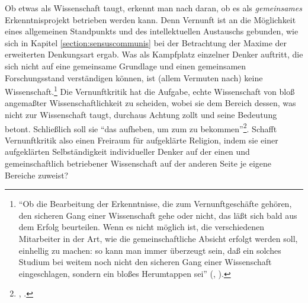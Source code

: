 Ob etwas als Wissenschaft taugt, erkennt man nach  daran,
ob es als \emph{gemeinsames} Erkenntnisprojekt betrieben werden kann. Denn Vernunft
ist an die Möglichkeit eines allgemeinen Standpunkts und des
intellektuellen Austauschs gebunden, wie sich in Kapitel
\ref{section:sensuscommunis} bei der Betrachtung der Maxime der erweiterten
Denkungsart ergab. Was als Kampfplatz einzelner Denker auftritt, die sich nicht
auf eine gemeinsame Grundlage und einen gemeinsamen Forschungsstand verständigen
können, ist (allem Vermuten nach) keine Wissenschaft.\footnote{\enquote{Ob die
Bearbeitung der Erkenntnisse, die zum Vernunftgeschäfte gehören, den sicheren
Gang einer Wissenschaft gehe oder nicht, das läßt sich bald aus dem Erfolg beurteilen.
Wenn \punkt{} es nicht möglich ist, die verschiedenen Mitarbeiter in der Art,
wie die gemeinschaftliche Absicht erfolgt werden soll, einhellig zu machen: so
kann man immer überzeugt sein, daß ein solches Studium bei weitem noch nicht den
sicheren Gang einer Wissenschaft eingeschlagen, sondern ein bloßes Herumtappen
sei} (\cite[][B vii]{Kant:KritikderreinenVernunft2003},
\cite[][III: 7.2--4, 7--11]{Kant:GesammelteWerke1900ff.}).} Die Vernunftkritik hat
die Aufgabe, echte Wissenschaft von bloß angemaßter Wissenschaftlichkeit
zu scheiden, wobei sie dem Bereich dessen, was nicht zur Wissenschaft taugt,
durchaus Achtung zollt und seine Bedeutung betont. Schließlich soll sie
\enquote{das  aufheben, um zum  zu
bekommen}\footnote{\cite[B xxx]{Kant:KritikderreinenVernunft2003},
\cite[III: 19.6]{Kant:GesammelteWerke1900ff.}.}. Schafft Vernunftkritik also
einen Freiraum für aufgeklärte Religion, indem sie einer aufgeklärten
Selbständigkeit individueller Denker auf der einen und gemeinschaftlich
betriebener Wissenschaft auf der anderen Seite je eigene Bereiche zuweist?

